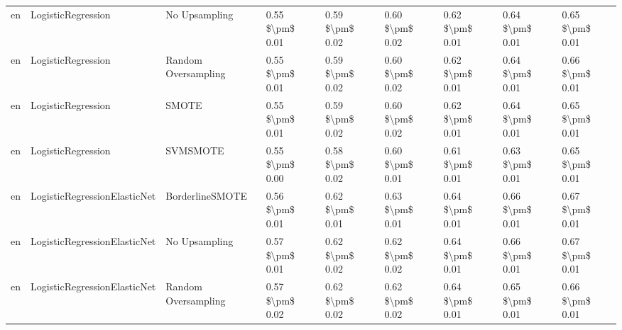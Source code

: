 \begin{tabular}{lllllllll}
      en &              LogisticRegression &                 No Upsampling & 0.55 \$\textbackslash pm\$ 0.01 &           0.59 \$\textbackslash pm\$ 0.02 &       0.60 \$\textbackslash pm\$ 0.02 &        0.62 \$\textbackslash pm\$ 0.01 &                         0.64 \$\textbackslash pm\$ 0.01 &     0.65 \$\textbackslash pm\$ 0.01 \\
      en &              LogisticRegression &           Random Oversampling & 0.55 \$\textbackslash pm\$ 0.01 &           0.59 \$\textbackslash pm\$ 0.02 &       0.60 \$\textbackslash pm\$ 0.02 &        0.62 \$\textbackslash pm\$ 0.01 &                         0.64 \$\textbackslash pm\$ 0.01 &     0.66 \$\textbackslash pm\$ 0.01 \\
      en &              LogisticRegression &                         SMOTE & 0.55 \$\textbackslash pm\$ 0.01 &           0.59 \$\textbackslash pm\$ 0.02 &       0.60 \$\textbackslash pm\$ 0.02 &        0.62 \$\textbackslash pm\$ 0.01 &                         0.64 \$\textbackslash pm\$ 0.01 &     0.65 \$\textbackslash pm\$ 0.01 \\
      en &              LogisticRegression &                      SVMSMOTE & 0.55 \$\textbackslash pm\$ 0.00 &           0.58 \$\textbackslash pm\$ 0.02 &       0.60 \$\textbackslash pm\$ 0.01 &        0.61 \$\textbackslash pm\$ 0.01 &                         0.63 \$\textbackslash pm\$ 0.01 &     0.65 \$\textbackslash pm\$ 0.01 \\
      en &    LogisticRegressionElasticNet &               BorderlineSMOTE & 0.56 \$\textbackslash pm\$ 0.01 &           0.62 \$\textbackslash pm\$ 0.01 &       0.63 \$\textbackslash pm\$ 0.01 &        0.64 \$\textbackslash pm\$ 0.01 &                         0.66 \$\textbackslash pm\$ 0.01 &     0.67 \$\textbackslash pm\$ 0.01 \\
      en &    LogisticRegressionElasticNet &                 No Upsampling & 0.57 \$\textbackslash pm\$ 0.01 &           0.62 \$\textbackslash pm\$ 0.02 &       0.62 \$\textbackslash pm\$ 0.02 &        0.64 \$\textbackslash pm\$ 0.01 &                         0.66 \$\textbackslash pm\$ 0.01 &     0.67 \$\textbackslash pm\$ 0.01 \\
      en &    LogisticRegressionElasticNet &           Random Oversampling & 0.57 \$\textbackslash pm\$ 0.02 &           0.62 \$\textbackslash pm\$ 0.02 &       0.62 \$\textbackslash pm\$ 0.02 &        0.64 \$\textbackslash pm\$ 0.01 &                         0.65 \$\textbackslash pm\$ 0.01 &     0.66 \$\textbackslash pm\$ 0.01 \\

\end{tabular}
